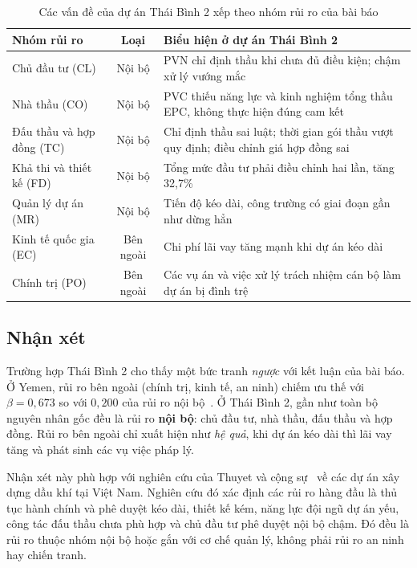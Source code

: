 \begin{table}[H]
\centering
\caption{Các vấn đề của dự án Thái Bình 2 xếp theo nhóm rủi ro của bài báo}
\label{tab:tb2-nhom}
\begin{tabularx}{\textwidth}{@{}L{3.4cm}cX@{}}
\toprule
\textbf{Nhóm rủi ro} & \textbf{Loại} & \textbf{Biểu hiện ở dự án Thái Bình 2} \\
\midrule
Chủ đầu tư (CL) & Nội bộ & PVN chỉ định thầu khi chưa đủ điều kiện; chậm xử lý vướng mắc \\
Nhà thầu (CO) & Nội bộ & PVC thiếu năng lực và kinh nghiệm tổng thầu EPC, không thực hiện đúng cam kết \\
Đấu thầu và hợp đồng (TC) & Nội bộ & Chỉ định thầu sai luật; thời gian gói thầu vượt quy định; điều chỉnh giá hợp đồng sai \\
Khả thi và thiết kế (FD) & Nội bộ & Tổng mức đầu tư phải điều chỉnh hai lần, tăng 32,7\% \\
Quản lý dự án (MR) & Nội bộ & Tiến độ kéo dài, công trường có giai đoạn gần như dừng hẳn \\
Kinh tế quốc gia (EC) & Bên ngoài & Chi phí lãi vay tăng mạnh khi dự án kéo dài \\
Chính trị (PO) & Bên ngoài & Các vụ án và việc xử lý trách nhiệm cán bộ làm dự án bị đình trệ \\
\bottomrule
\end{tabularx}
\end{table}

\subsection{Nhận xét}

Trường hợp Thái Bình 2 cho thấy một bức tranh \emph{ngược} với kết luận của bài báo. Ở Yemen, rủi ro bên ngoài (chính trị, kinh tế, an ninh) chiếm ưu thế với $\beta = 0{,}673$ so với $0{,}200$ của rủi ro nội bộ~\cite{kassem2022}. Ở Thái Bình 2, gần như toàn bộ nguyên nhân gốc đều là rủi ro \textbf{nội bộ}: chủ đầu tư, nhà thầu, đấu thầu và hợp đồng. Rủi ro bên ngoài chỉ xuất hiện như \emph{hệ quả}, khi dự án kéo dài thì lãi vay tăng và phát sinh các vụ việc pháp lý.

Nhận xét này phù hợp với nghiên cứu của Thuyet và cộng sự~\cite{thuyet2007} về các dự án xây dựng dầu khí tại Việt Nam. Nghiên cứu đó xác định các rủi ro hàng đầu là thủ tục hành chính và phê duyệt kéo dài, thiết kế kém, năng lực đội ngũ dự án yếu, công tác đấu thầu chưa phù hợp và chủ đầu tư phê duyệt nội bộ chậm. Đó đều là rủi ro thuộc nhóm nội bộ hoặc gắn với cơ chế quản lý, không phải rủi ro an ninh hay chiến tranh.

